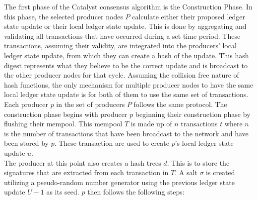 The first phase of the Catalyst consensus algorithm is the Construction Phase. In this phase, the selected producer nodes $P$ calculate either their proposed ledger state update or their local ledger state update. %
This is done by aggregating and validating all transactions that have occurred during a set time period. These transactions, assuming their validity, are integrated into the producers' local ledger state update, from which they can create a hash of the update. This hash digest represents what they believe to be the correct update and is broadcast to the other producer nodes for that cycle. %
Assuming the collision free nature of hash functions, the only mechanism for multiple producer nodes to have the same local ledger state update is for both of them to use the same set of transactions. \\

Each producer $p$ in the set of producers $P$ follows the same protocol. The construction phase begins with producer $p$ beginning their construction phase by flushing their mempool. This mempool $T$ is made up of $n$ transactions $t$  where $n$ is the number of transactions that have been broadcast to the network and have been stored by $p$. These transaction are used to create $p$'s local ledger state update $u$. \\

The producer at this point also creates a hash trees $d$. This is to store the signatures that are extracted from each transaction in $T$. A salt $\sigma$ is created utilizing a pseudo-random number generator using the previous ledger state update $U-1$ as its seed. $p$ then follows the following steps:

